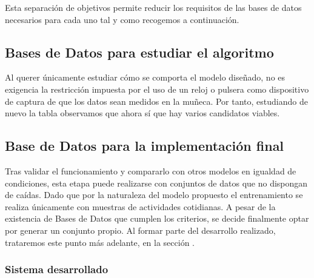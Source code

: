 Esta separación de objetivos permite reducir los requisitos de las bases de datos necesarios para cada uno tal y como recogemos a continuación.


\subsection{Bases de Datos para estudiar el algoritmo}

Al querer únicamente estudiar cómo se comporta el modelo diseñado, no es exigencia la restricción impuesta por el uso de un reloj o pulsera como dispositivo de captura de que los datos sean medidos en la muñeca. Por tanto, estudiando de nuevo la tabla  observamos que ahora sí que hay varios candidatos viables.


\subsection{Base de Datos para la implementación final}

Tras validar el funcionamiento y compararlo con otros modelos en igualdad de condiciones, esta etapa puede realizarse con conjuntos de datos que no dispongan de caídas. Dado que por la naturaleza del modelo propuesto el entrenamiento se realiza únicamente con muestras de actividades cotidianas. A pesar de la existencia de Bases de Datos que cumplen los criterios, se decide finalmente optar por generar un conjunto propio. Al formar parte del desarrollo realizado, trataremos este punto más adelante, en la sección . 








\subsubsection{Sistema desarrollado }



